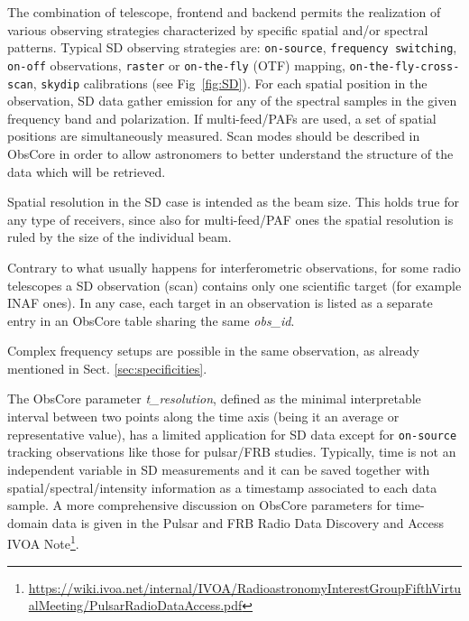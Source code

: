 \documentclass[11pt,a4paper]{ivoa}
\begin{document}
The combination of telescope, frontend and backend permits the realization of various observing strategies characterized by specific spatial and/or spectral patterns.
Typical SD observing strategies are: \texttt{on-source}, \texttt{frequency switching}, \texttt{on-off} observations, \texttt{raster} or \texttt{on-the-fly} (OTF) mapping, \texttt{on-the-fly-cross-scan}, \texttt{skydip} calibrations (see Fig~\ref{fig:SD}). For each spatial position in the observation, SD data gather emission for any of the spectral samples in the given frequency band and polarization.
If multi-feed/PAFs are used, a set of spatial positions are simultaneously measured. Scan modes should be described in ObsCore in order to allow astronomers to better understand the structure of the data which will be retrieved.

Spatial resolution in the SD case is intended as the beam size. This holds true for any type of receivers, since also for multi-feed/PAF ones the spatial resolution is ruled by the size of the individual beam.

Contrary to what usually happens for  interferometric observations, for some radio telescopes a SD observation (scan) contains only one scientific target (for example INAF ones). In any case, each target in an observation is listed as a separate entry in an ObsCore table sharing the same \emph{obs\_id}.

Complex frequency setups are possible in the same observation, as already mentioned in Sect. \ref{sec:specificities}.

The ObsCore parameter \emph{t\_resolution}, defined as the minimal interpretable interval between two points along the
time axis (being it an average or representative value), has a limited application for SD data except for \texttt{on-source} tracking observations like those for pulsar/FRB studies.
Typically, time is not an independent variable in SD measurements and it can be saved together with spatial/spectral/intensity
information as a timestamp associated to each data sample. 
A more comprehensive discussion on ObsCore parameters for time-domain data is given in the Pulsar
and FRB Radio Data Discovery and Access IVOA Note\footnote{\url{https://wiki.ivoa.net/internal/IVOA/RadioastronomyInterestGroupFifthVirtualMeeting/PulsarRadioDataAccess.pdf}}.
\end{document}
